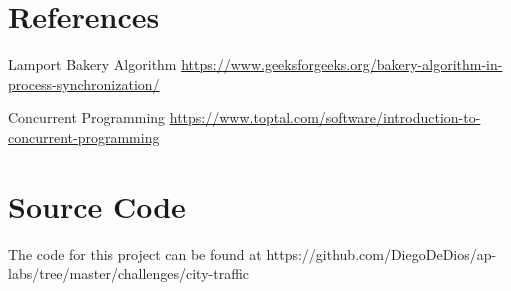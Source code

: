 \documentclass[a4paper]{article}
\begin{document}
\section{References}

\begin{thebibliography}{} 

    Lamport Bakery Algorithm \url{https://www.geeksforgeeks.org/bakery-algorithm-in-process-synchronization/}

    Concurrent Programming \url{https://www.toptal.com/software/introduction-to-concurrent-programming}

\end{thebibliography}

\section {Source Code}{
The code for this project can be found at https://github.com/DiegoDeDios/ap-labs/tree/master/challenges/city-traffic
}
\end{document}
